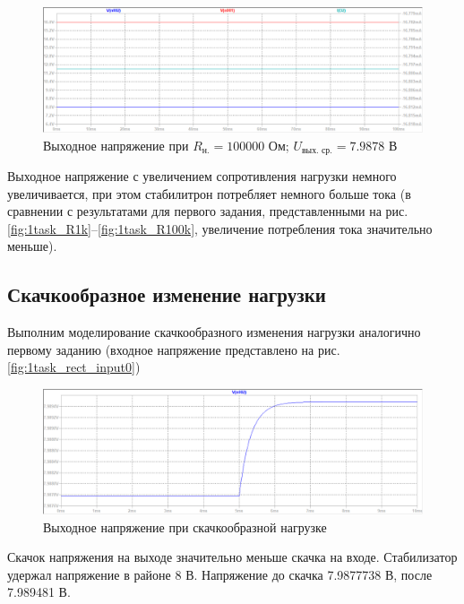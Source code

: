 \documentclass[a4paper, 12pt]{article}
\begin{document}
    \begin{figure}[H]
        \centering
        \includegraphics[scale=0.46]{2task_R100k.png}
        \captionsetup{skip=0pt}
        \caption{Выходное напряжение при $R_{\text{н.}}=100000$ Ом; $U_{\text{вых. ср.}}=7.9878$ В}
        \label{fig:2task_R100k}
    \end{figure}
    \noindent Выходное напряжение с увеличением сопротивления нагрузки немного увеличивается,
    при этом стабилитрон потребляет немного больше тока (в сравнении с результатами для первого задания, представленными
    на рис. \ref{fig:1task_R1k}--\ref{fig:1task_R100k}, увеличение потребления тока значительно меньше).


    \subsection{Скачкообразное изменение нагрузки}
    Выполним моделирование скачкообразного изменения нагрузки аналогично первому заданию
    (входное напряжение представлено на рис. \ref{fig:1task_rect_input0})
    \begin{figure}[H]
        \centering
        \includegraphics[scale=0.46]{2task_rect.png}
        \captionsetup{skip=0pt}
        \caption{Выходное напряжение при скачкообразной нагрузке}
        \label{fig:2task_rect}
    \end{figure}
    \noindent Скачок напряжения на выходе значительно меньше скачка на входе. Стабилизатор
    удержал напряжение в районе 8 В. Напряжение до скачка 7.9877738 В, после 7.989481 В.
\end{document}
